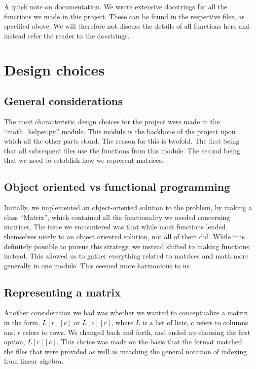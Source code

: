 \documentclass[letterpaper, 12 pt, conference]{ieeeconf}
\begin{document}
A quick note on documentation. We wrote extensive docstrings for all the functions we made in this project. These can be found in the respective files, as specified above. We will therefore not discuss the details of all functions here and instead refer the reader to the docstrings. 

\section{Design choices}

\subsection{General considerations}

The most characteristic design choices for the project were made in the “math\_helper.py” module. This module is the backbone of the project upon which all the other parts stand. The reason for this is twofold. The first being that all subsequent files use the functions from this module. The second being that we need to establish how we represent matrices.

\subsection{Object oriented vs functional programming}

Initially, we implemented an object-oriented solution to the problem, by making a class “Matrix”, which contained all the functionality we needed concerning matrices. The issue we encountered was that while most functions lended themselves nicely to an object oriented solution, not all of them did. While it is definitely possible to pursue this strategy, we instead shifted to making functions instead. This allowed us to gather everything related to matrices and math more generally in one module. This seemed more harmonious to us. 

\subsection{Representing a matrix}

Another consideration we had was whether we wanted to conceptualize a matrix in the form, $L[r][c]$ or $L[c][r]$, where $L$ is a list of lists, $c$ refers to columns and $r$ refers to rows. We changed back and forth, and ended up choosing the first option, $L[r][c]$. This choice was made on the basis that the format matched the files that were provided as well as matching the general notation of indexing from linear algebra.
\end{document}
